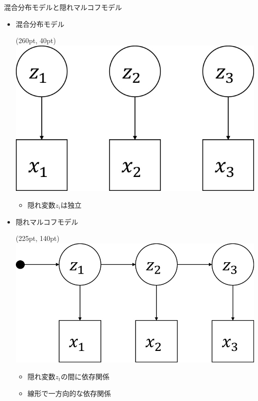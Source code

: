 \documentclass[aspectratio=169,unicode,dvipdfmx,14pt]{beamer}
\begin{document}
\begin{frame}{混合分布モデルと隠れマルコフモデル}
\begin{itemize}
\item 混合分布モデル
\begin{textblock*}{0.4\linewidth}(260pt, 40pt)
    \centering
    \includegraphics[width=\linewidth]{HMM1.jpg}
\end{textblock*}
\begin{itemize}
\item 隠れ変数$z_i$は独立
\end{itemize}
\vspace{1in}
\item 隠れマルコフモデル
\begin{textblock*}{0.4\linewidth}(225pt, 140pt)
    \centering
    \includegraphics[width=1.25\linewidth]{HMM2.jpg}
\end{textblock*}
\begin{itemize}
\item 隠れ変数$z_t$の間に依存関係
\item 線形で一方向的な依存関係
\end{itemize}
\end{itemize}
\end{frame}
\end{document}
